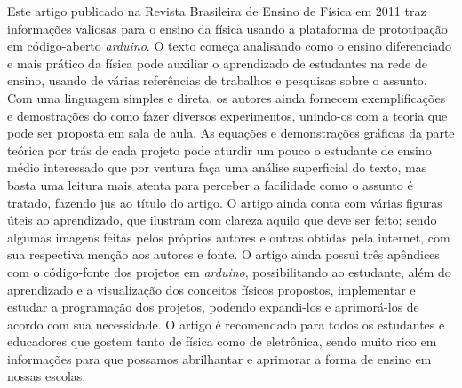 \documentclass[12pt, a4paper]{article}
\begin{document}
    \vskip10mm
    
Este artigo publicado na Revista Brasileira de Ensino de Física em 2011 traz informações valiosas para o ensino da física usando a plataforma de prototipação em código-aberto \textit{arduino}. O texto começa analisando como o ensino diferenciado e mais prático da física pode auxiliar o aprendizado de estudantes na rede de ensino, usando de várias referências de trabalhos e pesquisas sobre o assunto. Com uma linguagem simples e direta, os autores ainda fornecem exemplificações e demostrações do como fazer diversos experimentos, unindo-os com a teoria que pode ser proposta em sala de aula. As equações e demonstrações gráficas da parte teórica por trás de cada projeto pode aturdir um pouco o estudante de ensino médio interessado que por ventura faça uma análise superficial do texto, mas basta uma leitura mais atenta para perceber a facilidade como o assunto é tratado, fazendo jus ao título do artigo. O artigo ainda conta com várias figuras úteis ao aprendizado, que ilustram com clareza aquilo que deve ser feito; sendo algumas imagens feitas pelos próprios autores e outras obtidas pela internet, com sua respectiva menção aos autores e fonte. O artigo ainda possui três apêndices com o código-fonte dos projetos em \textit{arduino}, possibilitando ao estudante, além do aprendizado e a visualização dos conceitos físicos propostos, implementar e estudar a programação dos projetos, podendo expandi-los e aprimorá-los de acordo com sua necessidade. O artigo é recomendado para todos os estudantes e educadores que gostem tanto de física como de eletrônica, sendo muito rico em informações para que possamos abrilhantar e aprimorar a forma de ensino em nossas escolas. 




%
%
\end{document}
